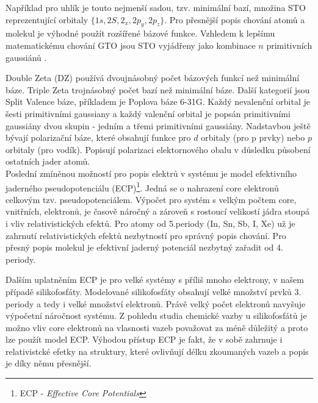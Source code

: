 \documentclass[
  digital, %
  table,   %
  lof,     %
  lot,     %
  oneside,
]{fithesis3}
\begin{document}
Například pro uhlík je touto nejmenší sadou, tzv. minimální bazí, množina STO reprezentující orbitaly $\{1s, 2S, 2_x, 2p_y, 2p_z \}$. Pro přesnější popis chování atomů a molekul je výhodné použít rozšířené bázové funkce. Vzhledem k lepšímu matematickému chování GTO jsou STO vyjádřeny jako kombinace $n$ primitivních gaussiánů \cite{lowe2011quantum}.

Double Zeta (DZ) používá dvoujnásobný počet bázových funkcí než minimální báze. Triple Zeta trojnásobný počet bazí než minimální báze. Další kategorií jsou Split Valence báze, příkladem je Poplova báze 6-31G. Každý nevalenční orbital je šesti primitivními gaussiany a každý valenční orbital je popsán primitivními gaussiány dvou skupin - jedním a třemi primitivními gaussiány. Nadstavbou ještě bývají polarizační báze, které obsahují funkce pro $d$ orbitaly (pro p prvky) nebo $p$ orbitaly (pro vodík). Popisují polarizaci elektornového obalu v důsledku působení ostatních jader atomů. \\

Poslední zmíněnou možností pro popis elektrů v systému je model efektivního jaderného pseudopotenciálu (ECP)\footnote{ECP - \textit{Effective Core Potentials}}. Jedná se o nahrazení core elektronů celkovým tzv. pseudopotenciálem. Výpočet pro systém s velkým počtem core, vnitřních, elektronů, je časově náročný a zároveň s rostoucí velikostí jádra stoupá i vliv relativistických efektů. Pro atomy od 5.periody (In, Sn, Sb, I, Xe) už je zahrnutí relativistických efektů nezbytností pro správný popis chování. Pro přesný popis molekul je efektivní jaderný potenciál nezbytný zařadit od 4. periody.

Dalším uplatněním ECP je pro velké systémy s příliš mnoho elektrony, v našem případě silikofosfáty. Modelované silikofosfáty obsahují velké množství prvků 3. periody a tedy i velké množství elektronů. Právě velký počet elektronů navyšuje výpočetní náročnost systému. Z pohledu studia chemické vazby u silikofosfátů je možno vliv core elektronů na vlasnosti vazeb považovat za méně důležitý a proto lze použít model ECP. Výhodou přístup ECP je fakt, že v sobě zahrnuje i relativistcké efetky na struktury, které ovlivňují délku zkoumaných vazeb a popis je díky němu přesnější.
\end{document}
